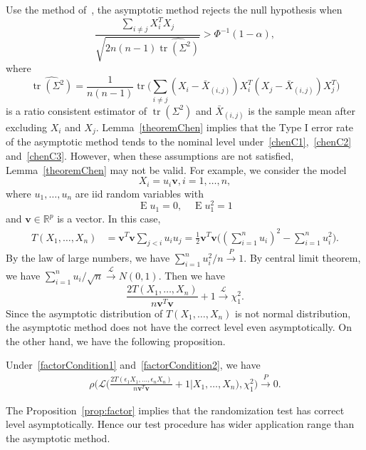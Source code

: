 \documentclass[smallcondensed,final,natbib]{svjour3}          %
\DeclareMathOperator{\mytr}{tr}
\DeclareMathOperator{\myE}{E}
\newcommand{\Bv}{\mathbf{v}}
\begin{document}
Use the method of~\citet{Chen2010A}, the asymptotic method rejects the null hypothesis when
\begin{equation*}
\frac{\sum_{i\neq j}X_i^T X_j}{\sqrt{2n(n-1)\widehat{\mytr(\Sigma^2)}}}>\Phi^{-1}(1-\alpha),
\end{equation*}
where
 \begin{equation*}
 \widehat{\mytr(\Sigma^2)}=\frac{1}{n(n-1)}\mytr\Big(\sum_{i\neq j}(X_i-\bar{X}_{(i,j)})X_i^T (X_j-\bar{X}_{(i,j)})X_j^T\Big)
 \end{equation*}
is a ratio consistent estimator of $\mytr(\Sigma^2)$ and $\bar{X}_{(i,j)}$ is the sample mean after excluding $X_i$ and $X_j$.
Lemma~\ref{theoremChen} implies that the Type I error rate of the asymptotic method  tends to the nominal level under~\eqref{chenC1},~\eqref{chenC2} and~\eqref{chenC3}.
However, when these assumptions are not satisfied, Lemma~\ref{theoremChen} may not be valid.
For example, we consider the model 
\begin{equation}\label{factorCondition1}
X_i=u_i\Bv, i=1,\ldots,n,
\end{equation}
where
 $u_1,\ldots,u_n$ are iid random variables with 
 \begin{equation}\label{factorCondition2}
 \myE u_1=0, \quad\myE u_1^2=1
 \end{equation}
 and $\Bv\in\mathbb{R}^p$ is a vector.
In this case, 
\begin{equation*}
    \begin{aligned}
        T(X_1,\ldots,X_n)&=\Bv^T \Bv\sum_{j<i} u_i u_j
        =\frac{1}{2}\Bv^T \Bv\big( (\sum_{i=1}^n u_i)^2-\sum_{i=1}^n u_i^2\big).
    \end{aligned}
\end{equation*}
By the law of large numbers, we have $\sum_{i=1}^n u_i^2/n\xrightarrow{P} 1$. By central limit theorem, we have $\sum_{i=1}^n u_i/\sqrt{n}\xrightarrow{\mathcal{L}}N(0,1)$. Then we have
\begin{equation*}
\frac{2T(X_1,\ldots,X_n)}{n\Bv^T \Bv }+1\xrightarrow{\mathcal{L}}\chi^2_1.
\end{equation*}
Since  the asymptotic distribution of $T(X_1,\ldots, X_n)$ is not normal distribution, the asymptotic method does not have the correct level even asymptotically.
On the other hand, we have the following proposition.
\begin{proposition}\label{prop:factor}
    Under~\eqref{factorCondition1} and~\eqref{factorCondition2}, we have
\begin{equation*}
    \begin{aligned}
        \rho\bigg(\mathcal{L}\Big(\frac{2T(\epsilon_1 X_1,\ldots,\epsilon_n X_n)}{n\Bv^T \Bv}+1\Big|X_1,\ldots,X_n\Big),\chi^2_1\bigg)\xrightarrow{P}0.
    \end{aligned}
\end{equation*}
\end{proposition}
The Proposition~\ref{prop:factor} implies that the randomization test has correct level asymptotically.
Hence our test procedure has wider application range than the asymptotic method.
\end{document}
